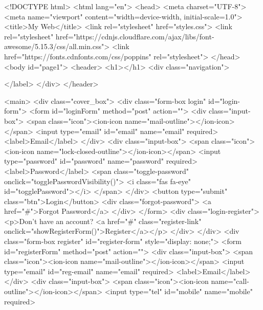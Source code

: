 <!DOCTYPE html>
<html lang="en">
<head>
    <meta charset="UTF-8">
    <meta name="viewport" content="width=device-width, initial-scale=1.0">
    <title>My Web</title>
    <link rel="stylesheet" href="styles.css">
    <link rel="stylesheet" href="https://cdnjs.cloudflare.com/ajax/libs/font-awesome/5.15.3/css/all.min.css">
    <link href="https://fonts.cdnfonts.com/css/poppins" rel="stylesheet">
</head>
<body id="page1">
    <header>
        <h1></h1>
        <div class="navigation">
           
        </label>
        </div>
    </header>
    
    <main>
        <div class="cover_box">
            <div class="form-box login" id="login-form">
                <form id="loginForm" method="post" action="">
                    <div class="input-box">
                        <span class="icon"><ion-icon name="mail-outline"></ion-icon></span>
                        <input type="email" id="email" name="email" required>
                        <label>Email</label>
                    </div>
                    <div class="input-box">
                        <span class="icon"><ion-icon name="lock-closed-outline"></ion-icon></span>
                        <input type="password" id="password" name="password" required>
                        <label>Password</label>
                        <span class="toggle-password" onclick="togglePasswordVisibility()">
                            <i class="fas fa-eye" id="togglePassword"></i>
                        </span>
                    </div>
                    <button type="submit" class="btn">Login</button>
                    <div class="forgot-password">
                        <a href="#">Forgot Password</a>
                    </div>
                </form>
                <div class="login-register">
                    <p>Don't have an account? <a href="#" class="register-link" onclick="showRegisterForm()">Register</a></p>
                </div>
            </div>
            <div class="form-box register" id="register-form" style="display: none;">
                <form id="registerForm" method="post" action="">
                    <div class="input-box">
                        <span class="icon"><ion-icon name="mail-outline"></ion-icon></span>
                        <input type="email" id="reg-email" name="email" required>
                        <label>Email</label>
                    </div>
                    <div class="input-box">
                        <span class="icon"><ion-icon name="call-outline"></ion-icon></span>
                        <input type="tel" id="mobile" name="mobile" required>
